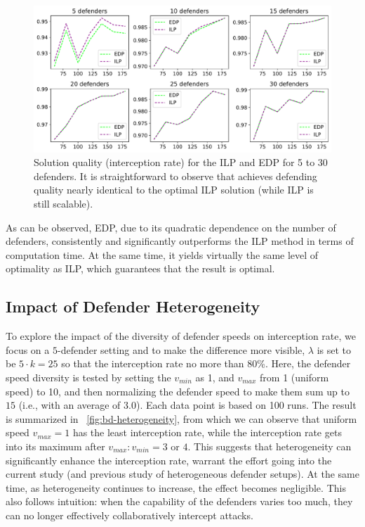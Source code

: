 \begin{figure}[h!]
    \centering
    \includegraphics[width=.7\linewidth]{chapters/bd/fig/def_quality.pdf}
    \caption[Solution quality (interception rate) for the ILP and EDP]{Solution quality (interception rate) for the ILP and EDP for 5 to 30 defenders. 
    It is straightforward to observe that \ours achieves defending quality nearly identical to the optimal ILP solution (while ILP is still scalable).}
    \label{fig:bd-def_quality}
\end{figure}

As can be observed, EDP, due to its quadratic dependence on the number of defenders, consistently and significantly outperforms the ILP method in terms of computation time. At the same time, it yields virtually the same level of optimality as ILP, which guarantees that the result is optimal. 

\subsection{Impact of Defender Heterogeneity}
To explore the impact of the diversity of defender speeds on interception rate, we focus on a $5$-defender setting and to make the difference more visible, 
$\lambda$ is set to be $5\cdot k = 25$ so that the interception rate no more than 80\%. 
Here, the defender speed diversity is tested by setting the $v_{min}$ as 1, and $v_{max}$ from 1 (uniform speed) to 10, 
and then normalizing the defender speed to make them sum up to $15$ (i.e., with an average of $3.0$). 
Each data point is based on 100 runs. The result is summarized in ~\ref{fig:bd-heterogeneity}, 
from which we can observe that uniform speed $v_{max} = 1$ has the least interception rate, 
while the interception rate gets into its maximum after $v_{max}:v_{min} = 3$ or $4$. 
This suggests that heterogeneity can significantly enhance the interception rate, 
warrant the effort going into the current study (and previous study of heterogeneous defender setups). 
At the same time, as heterogeneity continues to increase, the effect becomes negligible. 
This also follows intuition: when the capability of the defenders varies too much, 
they can no longer effectively collaboratively intercept attacks. 

